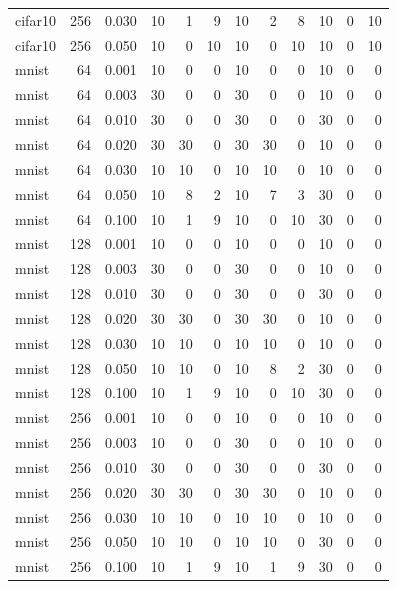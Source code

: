 \begin{table}[htbp]
{\begin{tabular}{@{}lrrrrrrrrrrr@{}}
cifar10 & 256 & 0.030 & 10 & 1 & 9 & 10 & 2 & 8 & 10 & 0 & 10 \\
cifar10 & 256 & 0.050 & 10 & 0 & 10 & 10 & 0 & 10 & 10 & 0 & 10 \\
mnist & 64 & 0.001 & 10 & 0 & 0 & 10 & 0 & 0 & 10 & 0 & 0 \\
mnist & 64 & 0.003 & 30 & 0 & 0 & 30 & 0 & 0 & 10 & 0 & 0 \\
mnist & 64 & 0.010 & 30 & 0 & 0 & 30 & 0 & 0 & 30 & 0 & 0 \\
mnist & 64 & 0.020 & 30 & 30 & 0 & 30 & 30 & 0 & 10 & 0 & 0 \\
mnist & 64 & 0.030 & 10 & 10 & 0 & 10 & 10 & 0 & 10 & 0 & 0 \\
mnist & 64 & 0.050 & 10 & 8 & 2 & 10 & 7 & 3 & 30 & 0 & 0 \\
mnist & 64 & 0.100 & 10 & 1 & 9 & 10 & 0 & 10 & 30 & 0 & 0 \\
mnist & 128 & 0.001 & 10 & 0 & 0 & 10 & 0 & 0 & 10 & 0 & 0 \\
mnist & 128 & 0.003 & 30 & 0 & 0 & 30 & 0 & 0 & 10 & 0 & 0 \\
mnist & 128 & 0.010 & 30 & 0 & 0 & 30 & 0 & 0 & 30 & 0 & 0 \\
mnist & 128 & 0.020 & 30 & 30 & 0 & 30 & 30 & 0 & 10 & 0 & 0 \\
mnist & 128 & 0.030 & 10 & 10 & 0 & 10 & 10 & 0 & 10 & 0 & 0 \\
mnist & 128 & 0.050 & 10 & 10 & 0 & 10 & 8 & 2 & 30 & 0 & 0 \\
mnist & 128 & 0.100 & 10 & 1 & 9 & 10 & 0 & 10 & 30 & 0 & 0 \\
mnist & 256 & 0.001 & 10 & 0 & 0 & 10 & 0 & 0 & 10 & 0 & 0 \\
mnist & 256 & 0.003 & 10 & 0 & 0 & 30 & 0 & 0 & 10 & 0 & 0 \\
mnist & 256 & 0.010 & 30 & 0 & 0 & 30 & 0 & 0 & 30 & 0 & 0 \\
mnist & 256 & 0.020 & 30 & 30 & 0 & 30 & 30 & 0 & 10 & 0 & 0 \\
mnist & 256 & 0.030 & 10 & 10 & 0 & 10 & 10 & 0 & 10 & 0 & 0 \\
mnist & 256 & 0.050 & 10 & 10 & 0 & 10 & 10 & 0 & 30 & 0 & 0 \\
mnist & 256 & 0.100 & 10 & 1 & 9 & 10 & 1 & 9 & 30 & 0 & 0 \\
\bottomrule
\end{tabular}}
\end{table}
